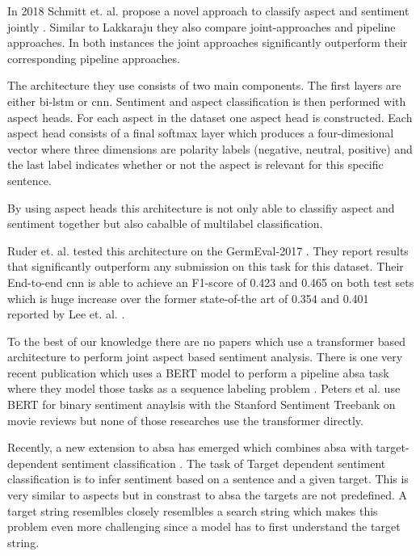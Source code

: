 In 2018 Schmitt et. al. propose a novel approach to classify aspect and sentiment jointly \cite{Schmitt2018}. Similar to Lakkaraju they also compare joint-approaches and pipeline approaches. In both instances the joint approaches significantly outperform their corresponding pipeline approaches. 

The architecture they use consists of two main components. The first layers are either bi-\gls{lstm} or \gls{cnn}. Sentiment and aspect classification is then performed with aspect heads. For each aspect in the dataset one aspect head is constructed. Each aspect head consists of a final softmax layer which produces a four-dimesional vector where three dimensions are polarity labels {(negative, neutral, positive)} and the last label indicates whether or not the aspect is relevant for this specific sentence. 

By using aspect heads this architecture is not only able to classifiy aspect and sentiment together but also cabalble of multilabel classification.

Ruder et. al. tested this architecture on the GermEval-2017 \cite{Wojatzki2017}. They report results that significantly outperform any submission on this task for this dataset. Their End-to-end \gls{cnn} is able to achieve an F1-score of 0.423 and 0.465 on both test sets which is huge increase over the former state-of-the art of 0.354 and 0.401 reported by Lee et. al. \cite{Lee2017}.
\medskip

To the best of our knowledge there are no papers which use a transformer based architecture to perform joint aspect based sentiment analysis. There is one very recent publication which uses a BERT \cite{Devlin2018} model to perform a pipeline \gls{absa} task where they model those tasks as a sequence labeling problem \cite{Xu2019}. Peters et al. use BERT for binary sentiment anaylsis with the Stanford Sentiment Treebank \cite{Socher2013} on movie reviews \cite{Peters2019} but none of those researches use the transformer directly.
\medskip

Recently, a new extension to \gls{absa} has emerged which combines \gls{absa} with target-dependent sentiment classification \cite{Tang2016}. The task of Target dependent sentiment classification is to infer sentiment based on a sentence and a given target. This is very similar to aspects but in constrast to \gls{absa} the targets are not predefined. A target string resemlbles closely resemlbles a search string which makes this problem even more challenging since a model has to first understand the target string.